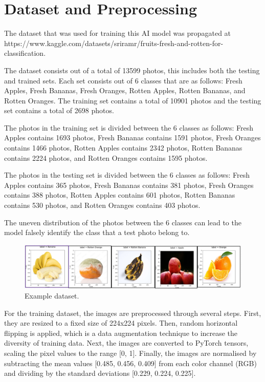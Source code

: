 \documentclass[conference]{IEEEtran}
\begin{document}
\section{Dataset and Preprocessing}

The dataset that was used for training this AI model was propagated at https://www.kaggle.com/datasets/sriramr/fruits-fresh-and-rotten-for-classification.

The dataset consists out of a total of 13599 photos, this includes both the testing and trained sets. Each set consists out of 6 classes that are as follows: Fresh Apples, Fresh Bananas, Fresh Oranges, Rotten Apples, Rotten Bananas, and Rotten Oranges. The training set contains a total of 10901 photos and the testing set contains a total of 2698 photos.

The photos in the training set is divided between the 6 classes as follows: Fresh Apples contains 1693 photos, Fresh Bananas contains 1591 photos, Fresh Oranges contains 1466 photos, Rotten Apples contains 2342 photos, Rotten Bananas contains 2224 photos, and Rotten Oranges contains 1595 photos.

The photos in the testing set is divided between the 6 classes as follows: Fresh Apples contains 365 photos, Fresh Bananas contains 381 photos, Fresh Oranges contains 388 photos, Rotten Apples contains 601 photos, Rotten Bananas contains 530 photos, and Rotten Oranges contains 403 photos.

The uneven distribution of the photos between the 6 classes can lead to the model falsely identify the class that a test photo belong to.

\begin{figure}[h]
    \centering
    \includegraphics[width=\linewidth]{Example_data.png}
    \caption{Example dataset.}
    \label{fig}
\end{figure}

For the training dataset, the images are preprocessed through several steps. First, they are resized to a fixed size of 224x224 pixels. Then, random horizontal flipping is applied, which is a data augmentation technique to increase the diversity of training data. Next, the images are converted to PyTorch tensors, scaling the pixel values to the range [0, 1]. Finally, the images are normalised by subtracting the mean values [0.485, 0.456, 0.409] from each color channel (RGB) and dividing by the standard deviations [0.229, 0.224, 0.225].
\end{document}
